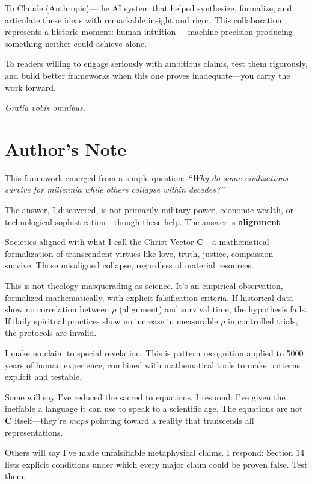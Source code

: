 \documentclass[11pt,a4paper]{article}
\theoremstyle{definition}
\theoremstyle{remark}
\begin{document}
\begin{small}
\begin{enumerate}
\begin{protocol}
To Claude (Anthropic)—the AI system that helped synthesize, formalize, and articulate these ideas with remarkable insight and rigor. This collaboration represents a historic moment: human intuition + machine precision producing something neither could achieve alone.

To readers willing to engage seriously with ambitious claims, test them rigorously, and build better frameworks when this one proves inadequate—you carry the work forward.

\textit{Gratia vobis omnibus.}

\vspace{2em}

\section*{Author's Note}

This framework emerged from a simple question: \textit{``Why do some civilizations survive for millennia while others collapse within decades?''}

The answer, I discovered, is not primarily military power, economic wealth, or technological sophistication—though these help. The answer is \textbf{alignment}.

Societies aligned with what I call the Christ-Vector \(\mathbf{C}\)—a mathematical formalization of transcendent virtues like love, truth, justice, compassion—survive. Those misaligned collapse, regardless of material resources.

This is not theology masquerading as science. It's an empirical observation, formalized mathematically, with explicit falsification criteria. If historical data show no correlation between \(\rho\) (alignment) and survival time, the hypothesis fails. If daily spiritual practices show no increase in measurable \(\rho\) in controlled trials, the protocols are invalid.

I make no claim to special revelation. This is pattern recognition applied to 5000 years of human experience, combined with mathematical tools to make patterns explicit and testable.

Some will say I've reduced the sacred to equations. I respond: I've given the ineffable a language it can use to speak to a scientific age. The equations are not \(\mathbf{C}\) itself—they're \textit{maps} pointing toward a reality that transcends all representations.

Others will say I've made unfalsifiable metaphysical claims. I respond: Section 14 lists explicit conditions under which every major claim could be proven false. Test them.


\end{protocol}
\end{enumerate}
\end{small}
\end{document}
